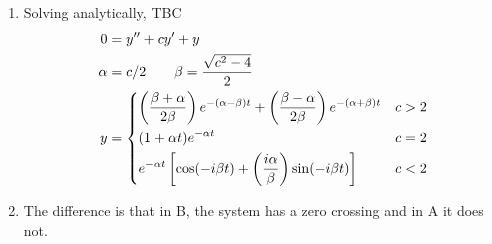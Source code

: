 \begin{enumerate}
\begin{enumerate}
              \item Solving analytically, TBC
                    \begin{align}
                        0      & = y'' + cy' + y                                                                                                                                       \\
                        \alpha & = c/2 \qquad \beta = \frac{\sqrt{c^{2} - 4}}{2}                                                                                                       \\
                        y      & = \begin{dcases}
                                       \left( \frac{\beta + \alpha}{2\beta} \right)e^{-(\alpha - \beta)t} + \left( \frac{\beta - \alpha}{2\beta} \right)e^{-(\alpha + \beta) t} & c > 2 \\
                                       (1 + \alpha t)e^{-\alpha t}                                                                                                              & c = 2 \\
                                       e^{-\alpha t}\left[\cos(-i\beta t) + \left( \frac{i\alpha}{\beta} \right) \sin(-i\beta t)\right]                                         & c < 2
                                   \end{dcases}
                    \end{align}

              \item The difference is that in B, the system has a zero crossing and in A it does not.
          \end{enumerate}
\end{enumerate}